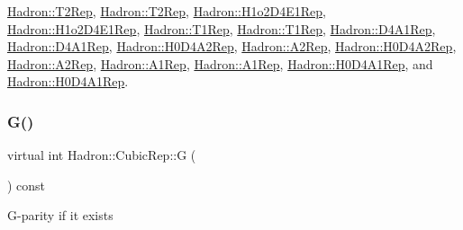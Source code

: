 \mbox{\hyperlink{structHadron_1_1T2Rep_a909c7165132829f8e1b837f7afa00e61}{Hadron\+::\+T2\+Rep}}, \mbox{\hyperlink{structHadron_1_1T2Rep_a909c7165132829f8e1b837f7afa00e61}{Hadron\+::\+T2\+Rep}}, \mbox{\hyperlink{structHadron_1_1H1o2D4E1Rep_a89d088da502c7cd8faeecc24caebcc97}{Hadron\+::\+H1o2\+D4\+E1\+Rep}}, \mbox{\hyperlink{structHadron_1_1H1o2D4E1Rep_a89d088da502c7cd8faeecc24caebcc97}{Hadron\+::\+H1o2\+D4\+E1\+Rep}}, \mbox{\hyperlink{structHadron_1_1T1Rep_a824c17669ccaf2513c03a3b41a25108e}{Hadron\+::\+T1\+Rep}}, \mbox{\hyperlink{structHadron_1_1T1Rep_a824c17669ccaf2513c03a3b41a25108e}{Hadron\+::\+T1\+Rep}}, \mbox{\hyperlink{structHadron_1_1D4A1Rep_a4224f0d47cc0a894a9da4c8505d51c29}{Hadron\+::\+D4\+A1\+Rep}}, \mbox{\hyperlink{structHadron_1_1D4A1Rep_a4224f0d47cc0a894a9da4c8505d51c29}{Hadron\+::\+D4\+A1\+Rep}}, \mbox{\hyperlink{structHadron_1_1H0D4A2Rep_a637522dc6caee2869b2bb632a4c5a5b5}{Hadron\+::\+H0\+D4\+A2\+Rep}}, \mbox{\hyperlink{structHadron_1_1A2Rep_a6c2da481eeb98634c640e8f17a569eea}{Hadron\+::\+A2\+Rep}}, \mbox{\hyperlink{structHadron_1_1H0D4A2Rep_a637522dc6caee2869b2bb632a4c5a5b5}{Hadron\+::\+H0\+D4\+A2\+Rep}}, \mbox{\hyperlink{structHadron_1_1A2Rep_a6c2da481eeb98634c640e8f17a569eea}{Hadron\+::\+A2\+Rep}}, \mbox{\hyperlink{structHadron_1_1A1Rep_a0d1f85837b8f29f9e51656b8bf2abfed}{Hadron\+::\+A1\+Rep}}, \mbox{\hyperlink{structHadron_1_1A1Rep_a0d1f85837b8f29f9e51656b8bf2abfed}{Hadron\+::\+A1\+Rep}}, \mbox{\hyperlink{structHadron_1_1H0D4A1Rep_ab13ff026da1bc59df4b52835038296d5}{Hadron\+::\+H0\+D4\+A1\+Rep}}, and \mbox{\hyperlink{structHadron_1_1H0D4A1Rep_ab13ff026da1bc59df4b52835038296d5}{Hadron\+::\+H0\+D4\+A1\+Rep}}.

\mbox{\label{structHadron_1_1CubicRep_a52104e43266d1614c00bbd1c3b395458}} 
\subsubsection{\texorpdfstring{G()}{G()}\hspace{0.1cm}{\footnotesize\ttfamily [2/2]}}
{\footnotesize\ttfamily virtual int Hadron\+::\+Cubic\+Rep\+::G (\begin{DoxyParamCaption}{ }\end{DoxyParamCaption}) const\hspace{0.3cm}{\ttfamily [pure virtual]}}

G-\/parity if it exists 

